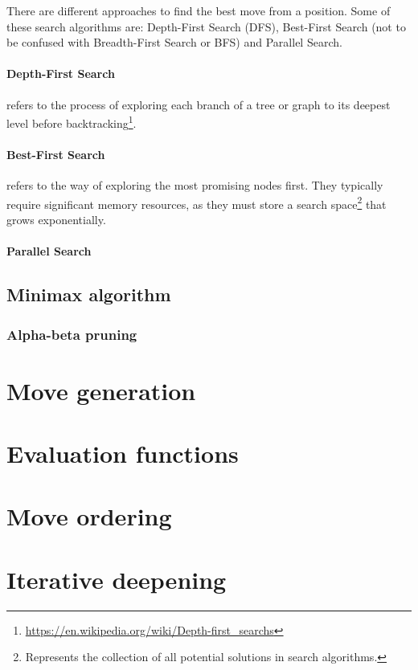 There are different approaches to find the best move from a position. Some of these search algorithms are: Depth-First Search (DFS), Best-First Search (not to be confused with Breadth-First Search or BFS) and Parallel Search.

\paragraph{Depth-First Search} refers to the process of exploring each branch of a tree or graph to its deepest level before backtracking\footnote{\url{https://en.wikipedia.org/wiki/Depth-first_searchs}}.

\paragraph{Best-First Search} refers to the way of exploring the most promising nodes first. They typically require significant memory resources, as they must store a search space\footnote{Represents the collection of all potential solutions in search algorithms.} that grows exponentially.

\paragraph{Parallel Search} 

\subsection{Minimax algorithm}

\subsubsection{Alpha-beta pruning}

\section{Move generation}

\section{Evaluation functions}

\section{Move ordering}

\section{Iterative deepening}

